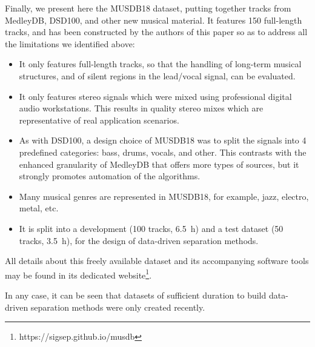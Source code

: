 Finally, we present here the MUSDB18 dataset, putting together tracks from MedleyDB, DSD100, and other new musical material. It features 150 full-length tracks, and has been constructed by the authors of this paper so as to address all the limitations we identified above:
\begin{itemize}[leftmargin=*]
\item It only features full-length tracks, so that the handling of long-term musical structures, and of silent regions in the lead/vocal signal, can be evaluated.
\item It only features stereo signals which were mixed using professional digital audio workstations. This results in quality stereo mixes which are representative of real application scenarios.
\item As with DSD100, a design choice of MUSDB18 was to split the signals into 4 predefined categories: bass, drums, vocals, and other. This contrasts with the enhanced granularity of MedleyDB that offers more types of sources, but it strongly promotes automation of the algorithms.
\item Many musical genres are represented in MUSDB18, for example, jazz, electro, metal, etc.
\item It is split into a development (100 tracks, 6.5~h) and a test dataset (50 tracks, 3.5~h), for the design of data-driven separation methods.
\end{itemize}

All details about this freely available dataset and its accompanying software tools may be found in its dedicated website\footnote{https://sigsep.github.io/musdb}.

In any case, it can be seen that datasets of sufficient duration to build data-driven separation methods were only created recently.

